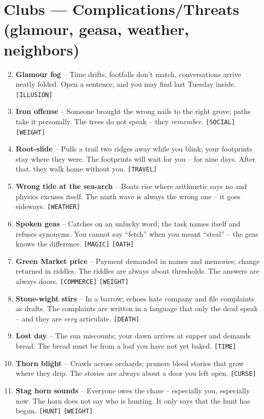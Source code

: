 \section*{Clubs --- Complications/Threats (glamour, geasa, weather, neighbors)}
\label{sec:aelinnel-complications}
\begin{enumerate}
\setcounter{enumi}{1}
\item \textbf{Glamour fog} -- Time drifts, footfalls don't match, conversations arrive neatly folded. Open a sentence, and you may find last Tuesday inside. \texttt{[ILLUSION]}
\item \textbf{Iron offense} -- Someone brought the wrong nails to the right grove; paths take it personally. The trees do not speak -- they \emph{remember}. \texttt{[SOCIAL]} \texttt{[WEIGHT]}
\item \textbf{Root-slide} -- Pulls a trail two ridges away while you blink; your footprints stay where they were. The footprints will wait for you -- for nine days. After that, they walk home without you. \texttt{[TRAVEL]}
\item \textbf{Wrong tide at the sea-arch} -- Boats rise where arithmetic says no and physics excuses itself. The ninth wave is always the wrong one -- it goes sideways. \texttt{[WEATHER]}
\item \textbf{Spoken geas} -- Catches on an unlucky word; the task names itself and refuses synonyms. You cannot say ``fetch'' when you meant ``steal'' -- the geas knows the difference. \texttt{[MAGIC]} \texttt{[OATH]}
\item \textbf{Green Market price} -- Payment demanded in names and memories; change returned in riddles. The riddles are always about thresholds. The answers are always doors. \texttt{[COMMERCE]} \texttt{[WEIGHT]}
\item \textbf{Stone-wight stirs} -- In a barrow; echoes hate company and file complaints as drafts. The complaints are written in a language that only the dead speak -- and they are \emph{very} articulate. \texttt{[DEATH]}
\item \textbf{Lost day} -- The sun miscounts; your dawn arrives at supper and demands bread. The bread must be from a loaf you have not yet baked. \texttt{[TIME]}
\item \textbf{Thorn blight} -- Crawls across orchards; pruners bleed stories that grow where they drip. The stories are always about a door you left open. \texttt{[CURSE]}
\item[J] \textbf{Stag horn sounds} -- Everyone owes the chase -- especially you, especially now. The horn does not say who is hunting. It only says that the hunt has begun. \texttt{[HUNT]} \texttt{[WEIGHT]}

\end{enumerate}
